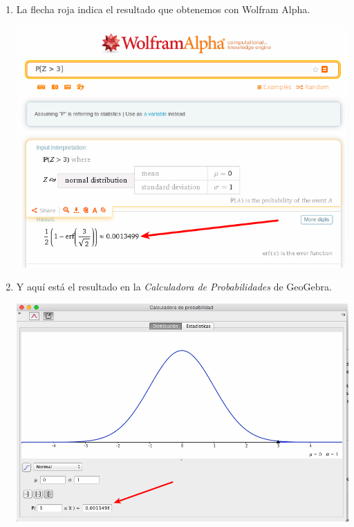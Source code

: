 \documentclass[10pt,a4paper]{article}\usepackage[]{graphicx}\usepackage[]{color}
\begin{document}
\begin{enumerate}
  \item La flecha roja indica el resultado que obtenemos con Wolfram Alpha.
    \begin{center}
	\includegraphics[width=14cm]{../fig/Tut07-08.png}
    \end{center}

  \item Y aquí está el resultado en la {\em Calculadora de Probabilidades} de GeoGebra.
    \begin{center}
	\includegraphics[width=14cm]{../fig/Tut07-09.png}
    \end{center}


\end{enumerate}
\end{document}
